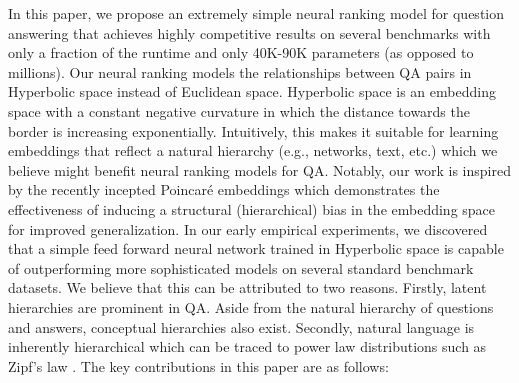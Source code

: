 \documentclass[sigconf]{acmart}
\begin{document}
In this paper, we propose an extremely simple neural ranking model for question answering that achieves highly competitive results on several benchmarks with only a fraction of the runtime and only 40K-90K parameters (as opposed to millions). Our neural ranking models the relationships between QA pairs in Hyperbolic space instead of Euclidean space. Hyperbolic space is an embedding space with a constant negative curvature in which the distance towards the border is increasing exponentially. Intuitively, this makes it suitable for learning embeddings that reflect a natural hierarchy (e.g., networks, text, etc.) which we believe might benefit neural ranking models for QA. Notably, our work is inspired by the recently incepted Poincar\'e embeddings \cite{DBLP:journals/corr/NickelK17} which demonstrates the effectiveness of inducing a structural (hierarchical) bias in the embedding space for improved generalization. In our early empirical experiments, we discovered that a simple feed forward neural network trained in Hyperbolic space is capable of outperforming more sophisticated models on several standard benchmark datasets. We believe that this can be attributed to two reasons. Firstly, latent hierarchies are prominent in QA. Aside from the natural hierarchy of questions and answers, conceptual hierarchies also exist. Secondly, natural language is inherently hierarchical which can be traced to power law distributions such as Zipf's law \cite{ravasz2003hierarchical}. The key contributions in this paper are as follows:
\end{document}
